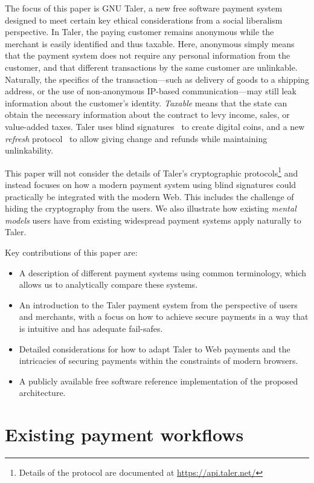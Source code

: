 \documentclass{llncs}
\begin{document}
The focus of this paper is GNU Taler, a new free software payment
system designed to meet certain key ethical considerations from a
social liberalism perspective. In Taler, the paying customer remains
anonymous while the merchant is easily identified and thus taxable.
Here, anonymous simply means that the payment system does not require
any personal information from the customer, and that different
transactions by the same customer are unlinkable.  Naturally, the
specifics of the transaction---such as delivery of goods to a shipping
address, or the use of non-anonymous IP-based communication---may
still leak information about the customer's identity.  {\em Taxable}
means that the state can obtain the necessary information about the
contract to levy income, sales, or value-added taxes.  Taler uses
blind signatures~\cite{chaum1983blind} to create digital coins, and a
new {\em refresh} protocol~\cite{talercrypto} to allow giving change
and refunds while maintaining unlinkability.

This paper will not consider the details of Taler's cryptographic
protocols\footnote{Details of the protocol are documented
at \url{https://api.taler.net/}} and instead focuses on how a modern
payment system using blind signatures could practically be integrated
with the modern Web.  This includes the challenge of hiding the
cryptography from the users.  We also illustrate how existing {\em
mental models} users have from existing widespread payment systems
apply naturally to Taler.

Key contributions of this paper are:
\begin{itemize}
 \item A description of different payment systems using
  common terminology, which allows us to analytically compare
  these systems.
 \item An introduction to the Taler payment system from the
  perspective of users and merchants, with a focus on how
  to achieve secure payments in a way that is intuitive and
  has adequate fail-safes.
 \item Detailed considerations for how to adapt Taler to
  Web payments and the intricacies of securing payments
  within the constraints of modern browsers.
 \item A publicly available free software
  reference implementation of the proposed architecture.
\end{itemize}


\section{Existing payment workflows}
\end{document}
